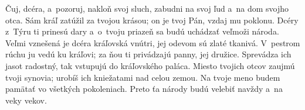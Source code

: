 Čuj, dcéra, a~pozoruj, nakloň svoj sluch,
zabudni na svoj ľud a~na dom svojho otca.
\versseparator
Sám kráľ zatúžil za tvojou krásou;
on je tvoj Pán, vzdaj mu poklonu.
\versseparator
Dcéry z~Týru ti prinesú dary
a~o~tvoju priazeň sa budú uchádzať veľmoži národa.
\versseparator
Veľmi vznešená je dcéra kráľovská vnútri,
jej odevom sú zlaté tkanivá.
V~pestrom rúchu ju vedú ku kráľovi;
\versseparator
za ňou ti privádzajú panny, jej družice.
\versseparator
Sprevádza ich jasot radostný,
tak vstupujú do kráľovského paláca.
\versseparator
Miesto tvojich otcov zaujmú tvoji synovia;
urobíš ich kniežatami nad celou zemou.
\versseparator
Na tvoje meno budem pamätať
vo všetkých pokoleniach.
\versseparator
Preto ťa národy budú velebiť navždy
a~na veky vekov.